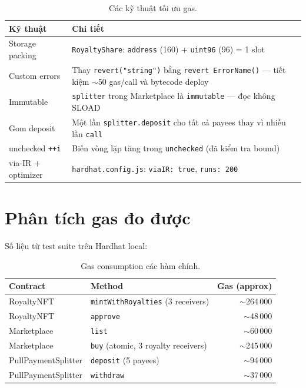 \documentclass[12pt,a4paper,oneside]{report}
\theoremstyle{plain}
\theoremstyle{definition}
\theoremstyle{remark}
\begin{document}
\begin{table}[H]
\centering\small
\begin{tabularx}{\textwidth}{l X}
\toprule
\textbf{Kỹ thuật} & \textbf{Chi tiết} \\
\midrule
Storage packing & \texttt{RoyaltyShare}: \texttt{address} (160) + \texttt{uint96} (96) = 1 slot \\
Custom errors & Thay \texttt{revert("string")} bằng \texttt{revert ErrorName()} — tiết kiệm $\sim$50 gas/call và bytecode deploy \\
Immutable & \texttt{splitter} trong Marketplace là \texttt{immutable} — đọc không SLOAD \\
Gom deposit & Một lần \texttt{splitter.deposit} cho tất cả payees thay vì nhiều lần \texttt{call} \\
unchecked \texttt{++i} & Biến vòng lặp tăng trong \texttt{unchecked} (đã kiểm tra bound) \\
via-IR + optimizer & \texttt{hardhat.config.js}: \texttt{viaIR: true}, \texttt{runs: 200} \\
\bottomrule
\end{tabularx}
\caption{Các kỹ thuật tối ưu gas.}
\end{table}

\section{Phân tích gas đo được}

Số liệu từ test suite trên Hardhat local:
\begin{table}[H]
\centering\small
\begin{tabular}{l l r}
\toprule
\textbf{Contract} & \textbf{Method} & \textbf{Gas (approx)} \\
\midrule
RoyaltyNFT & \texttt{mintWithRoyalties} (3 receivers) & $\sim$264\,000 \\
RoyaltyNFT & \texttt{approve} & $\sim$48\,000 \\
Marketplace & \texttt{list} & $\sim$60\,000 \\
Marketplace & \texttt{buy} (atomic, 3 royalty receivers) & $\sim$245\,000 \\
PullPaymentSplitter & \texttt{deposit} (5 payees) & $\sim$94\,000 \\
PullPaymentSplitter & \texttt{withdraw} & $\sim$37\,000 \\
\bottomrule
\end{tabular}
\caption{Gas consumption các hàm chính.}
\end{table}
\end{document}
